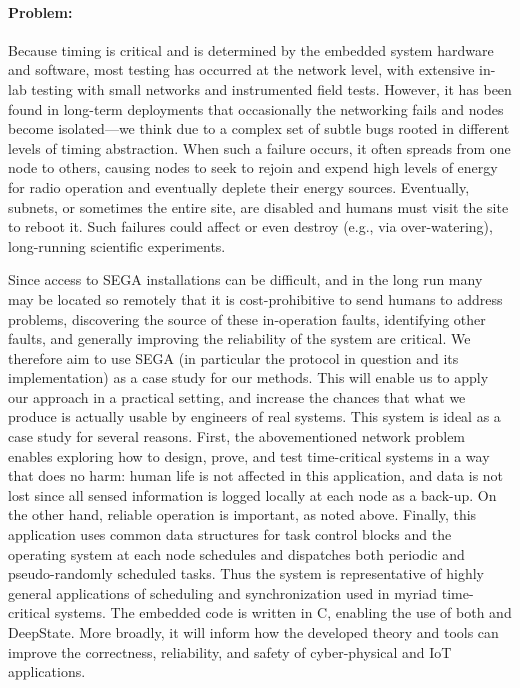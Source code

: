 \paragraph{Problem:}

Because timing is critical and is determined by the embedded system hardware and software, most testing has occurred at the network level, with extensive in-lab testing with small networks and instrumented field tests.
However, it has been found in long-term deployments %
that occasionally the networking fails and nodes become isolated---we think due to a complex set of subtle bugs rooted in different levels of timing abstraction.
When such a failure occurs, it often spreads from one node to others,
causing nodes to seek to rejoin and expend high levels of energy for radio operation and eventually deplete their energy sources.
Eventually, subnets, or sometimes the entire site, are disabled and humans must visit the site to reboot it.
Such failures could %
affect %
or even destroy (e.g., via over-watering), long-running scientific experiments.


Since access to SEGA installations can be difficult, and in the long run many may be located so remotely that it is cost-prohibitive to send humans to address problems, discovering the source of these in-operation faults, identifying other faults, and generally improving the reliability of the system are critical.
We therefore aim to use SEGA (in particular the protocol in question and its implementation) as a case study for our methods.
This will enable us to apply our approach in a practical setting, and increase the chances that what we produce is actually usable by engineers of real systems.
%
This system is ideal as a case study for several reasons.
First, the abovementioned network problem enables exploring how to design, prove, and test time-critical systems in a way that does no harm: human life is not affected in this application, and data is not lost since all sensed information is logged locally at each node as a back-up.
On the other hand, reliable operation is important, as noted above. %
Finally, this application uses common data structures for task control blocks and the operating system at each node schedules and dispatches both periodic and pseudo-randomly scheduled tasks.
Thus the system is representative of %
highly general applications of scheduling and synchronization used in myriad time-critical systems.
The embedded code is written in C, enabling the use of both \framac and DeepState.
More broadly, it will inform how the developed theory and tools can improve the correctness, reliability, and safety of cyber-physical and IoT applications.


